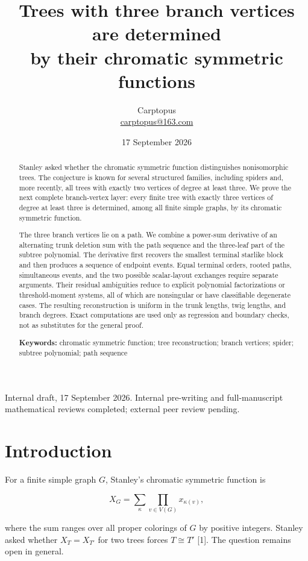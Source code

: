 \documentclass[11pt]{article}
\title{Trees with three branch vertices are determined\\
by their chromatic symmetric functions}
\author{Carptopus\\\href{mailto:carptopus@163.com}{carptopus@163.com}}
\date{17 September 2026}
\begin{document}
\maketitle

Internal draft, 17 September 2026. Internal pre-writing and full-manuscript mathematical reviews
completed; external peer review pending.
\begin{abstract}

Stanley asked whether the chromatic symmetric function distinguishes nonisomorphic trees. The
conjecture is known for several structured families, including spiders and, more recently, all trees
with exactly two vertices of degree at least three. We prove the next complete branch-vertex layer:
every finite tree with exactly three vertices of degree at least three is determined, among all
finite simple graphs, by its chromatic symmetric function.

The three branch vertices lie on a path. We combine a power-sum derivative of an alternating
trunk deletion sum with the path sequence and the three-leaf part of the subtree polynomial. The
derivative first recovers the smallest terminal starlike block and then produces a sequence of
endpoint events. Equal terminal orders, rooted paths, simultaneous events, and the two possible
scalar-layout exchanges require separate arguments. Their residual ambiguities reduce to explicit
polynomial factorizations or threshold-moment systems, all of which are nonsingular or have
classifiable degenerate cases. The resulting reconstruction is uniform in the trunk lengths, twig
lengths, and branch degrees. Exact computations are used only as regression and boundary checks,
not as substitutes for the general proof.

\textbf{Keywords:} chromatic symmetric function; tree reconstruction; branch vertices; spider; subtree
polynomial; path sequence

\end{abstract}

\section{Introduction}


For a finite simple graph $G$, Stanley's chromatic symmetric function is

\begin{equation*}
X_G=\sum_{\kappa}\prod_{v\in V(G)}x_{\kappa(v)},
\end{equation*}


where the sum ranges over all proper colorings of $G$ by positive integers. Stanley asked whether
$X_T=X_{T'}$ for two trees forces $T\cong T'$ [1]. The question remains open in general.
\end{document}
